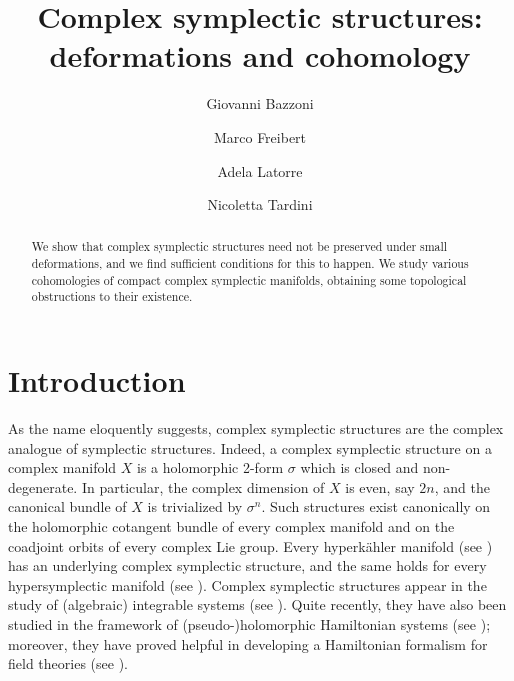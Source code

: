 \documentclass[a4paper]{amsart}
\theoremstyle{definition}
\theoremstyle{remark}
\numberwithin{equation}{section}
\begin{document}
\title[Complex symplectic structures: deformations and cohomology]{Complex symplectic structures: deformations and cohomology}

\author[G. Bazzoni]{Giovanni Bazzoni}
\address{Dipartimento di Scienza ed Alta Tecnologia, Universit\`a degli Studi dell'Insubria, Via Valleggio 11, 22100, Como, Italy}

\author[M. Freibert]{Marco Freibert}
\address{Fachbereich Mathematik, Universit\"at Hamburg, Bundesstra\ss e 55, D-20146 Hamburg, Germany}

\author[A. Latorre]{Adela Latorre}
\address{Departamento de Matemática Aplicada, Universidad Politécnica de Madrid,
Avda. Juan de Herrera 4, 28040 Madrid, Spain}

\author[N. Tardini]{Nicoletta Tardini}
\address{Dipartimento di Scienze Matematiche, Fisiche e Informatiche, Unità di Matematica e Informatica, Università degli Studi di Parma, Parco Area delle Scienze 53/A, 43124 Parma, Italy}


\date{}


\begin{abstract}
We show that complex symplectic structures need not be preserved under small deformations, and we find sufficient conditions for this to happen. We study various cohomologies of compact complex symplectic manifolds, obtaining some topological obstructions to their existence.
\end{abstract}

\maketitle

\section{Introduction}

As the name eloquently suggests, complex symplectic structures are the complex analogue of symplectic structures. Indeed, a complex symplectic structure on a complex manifold $X$ is a holomorphic 2-form $\sigma$ which is closed and non-degenerate. In particular, the complex dimension of $X$ is even, say $2n$, and the canonical bundle of $X$ is trivialized by $\sigma^n$. Such structures exist canonically on the holomorphic cotangent bundle of every complex manifold and on the coadjoint orbits of every complex Lie group. Every hyperk\"ahler manifold (see \cite{Hitchin1,Huybrechts}) has an underlying complex symplectic structure, and the same holds for every hypersymplectic manifold (see \cite{DaSw,Hitchin2}). Complex symplectic structures appear in the study of (algebraic) integrable systems (see \cite{Boalch}). Quite recently, they have also been studied in the framework of (pseudo-)holomorphic Hamiltonian systems (see \cite{Wagner}); moreover, they have proved helpful in developing a Hamiltonian formalism for field theories (see \cite{BrFa}).
\end{document}
